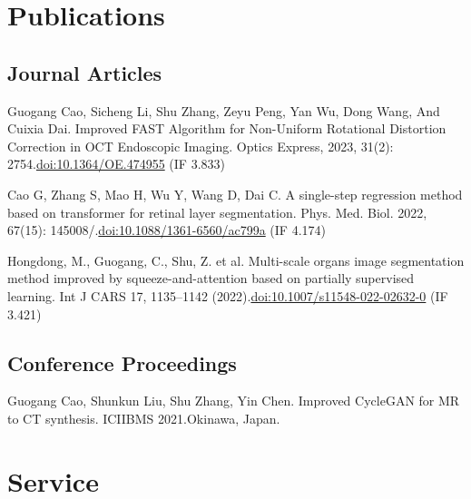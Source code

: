 \documentclass[11pt,letterpaper]{report}
\begin{document}
    \section*{Publications}

    \subsection*{Journal Articles}

    \begin{tablist}       

        \item Guogang Cao, Sicheng Li, Shu Zhang, Zeyu Peng, Yan Wu, Dong Wang, And Cuixia Dai. Improved FAST Algorithm for Non-Uniform Rotational Distortion Correction in OCT Endoscopic Imaging. Optics Express, 2023, 31(2): 2754.\href{https://doi.org/10.1364/OE.474955}{doi:10.1364/OE.474955} (IF 3.833)

        \item Cao G, Zhang S, Mao H, Wu Y, Wang D, Dai C. A single-step regression method based on transformer for retinal layer segmentation. Phys. Med. Biol. 2022, 67(15): 145008/.\href{https://doi.org/10.1088/1361-6560/ac799a}{doi:10.1088/1361-6560/ac799a} (IF 4.174)
        \item Hongdong, M., Guogang, C., Shu, Z. et al. Multi-scale organs image segmentation method improved by squeeze-and-attention based on partially supervised learning. Int J CARS 17, 1135–1142 (2022).\href{https://doi.org/10.1007/s11548-022-02632-0}{doi:10.1007/s11548-022-02632-0} (IF 3.421)
    \end{tablist}

    \subsection*{Conference Proceedings}

    \begin{tablist}

        \item Guogang Cao, Shunkun Liu, Shu Zhang, Yin Chen. Improved CycleGAN for MR to CT synthesis. ICIIBMS 2021.Okinawa, Japan.
        
    \end{tablist}


    \section*{Service}   
\end{document}
